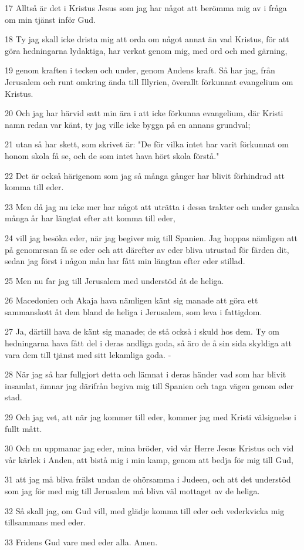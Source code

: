 \par 17 Alltså är det i Kristus Jesus som jag har något att berömma mig av i fråga om min tjänst inför Gud.
\par 18 Ty jag skall icke drista mig att orda om något annat än vad Kristus, för att göra hedningarna lydaktiga, har verkat genom mig, med ord och med gärning,
\par 19 genom kraften i tecken och under, genom Andens kraft. Så har jag, från Jerusalem och runt omkring ända till Illyrien, överallt förkunnat evangelium om Kristus.
\par 20 Och jag har härvid satt min ära i att icke förkunna evangelium, där Kristi namn redan var känt, ty jag ville icke bygga på en annans grundval;
\par 21 utan så har skett, som skrivet är: "De för vilka intet har varit förkunnat om honom skola få se, och de som intet hava hört skola förstå."
\par 22 Det är också härigenom som jag så många gånger har blivit förhindrad att komma till eder.
\par 23 Men då jag nu icke mer har något att uträtta i dessa trakter och under ganska många år har längtat efter att komma till eder,
\par 24 vill jag besöka eder, när jag begiver mig till Spanien. Jag hoppas nämligen att på genomresan få se eder och att därefter av eder bliva utrustad för färden dit, sedan jag först i någon mån har fått min längtan efter eder stillad.
\par 25 Men nu far jag till Jerusalem med understöd åt de heliga.
\par 26 Macedonien och Akaja hava nämligen känt sig manade att göra ett sammanskott åt dem bland de heliga i Jerusalem, som leva i fattigdom.
\par 27 Ja, därtill hava de känt sig manade; de stå också i skuld hos dem. Ty om hedningarna hava fått del i deras andliga goda, så äro de å sin sida skyldiga att vara dem till tjänst med sitt lekamliga goda. -
\par 28 När jag så har fullgjort detta och lämnat i deras händer vad som har blivit insamlat, ämnar jag därifrån begiva mig till Spanien och taga vägen genom eder stad.
\par 29 Och jag vet, att när jag kommer till eder, kommer jag med Kristi välsignelse i fullt mått.
\par 30 Och nu uppmanar jag eder, mina bröder, vid vår Herre Jesus Kristus och vid vår kärlek i Anden, att bistå mig i min kamp, genom att bedja för mig till Gud,
\par 31 att jag må bliva frälst undan de ohörsamma i Judeen, och att det understöd som jag för med mig till Jerusalem må bliva väl mottaget av de heliga.
\par 32 Så skall jag, om Gud vill, med glädje komma till eder och vederkvicka mig tillsammans med eder.
\par 33 Fridens Gud vare med eder alla. Amen.

